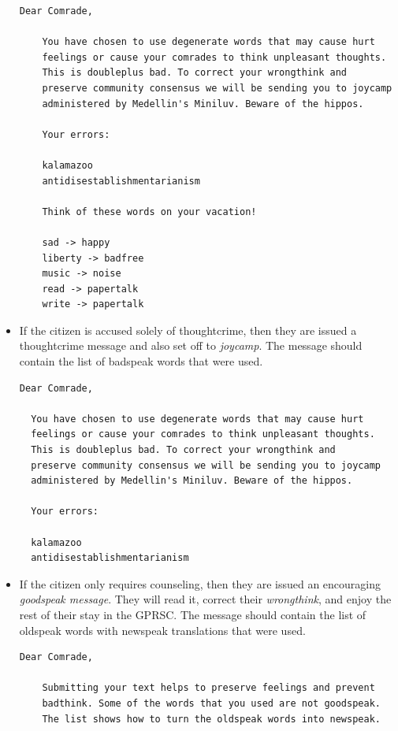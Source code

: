 \documentclass{article}
\begin{document}
\begin{itemize}
    \begin{lstlisting}[style=plainstyle]
    Dear Comrade,

    You have chosen to use degenerate words that may cause hurt
    feelings or cause your comrades to think unpleasant thoughts.
    This is doubleplus bad. To correct your wrongthink and
    preserve community consensus we will be sending you to joycamp
    administered by Medellin's Miniluv. Beware of the hippos.

    Your errors:

    kalamazoo
    antidisestablishmentarianism

    Think of these words on your vacation!

    sad -> happy
    liberty -> badfree
    music -> noise
    read -> papertalk
    write -> papertalk\end{lstlisting}

  \item If the citizen is accused solely of thoughtcrime, then they are
    issued a thoughtcrime message and also set off to \emph{joycamp}.
    The message should contain the list of badspeak words that were
    used.

  \begin{lstlisting}[style=plainstyle]
  Dear Comrade,

  You have chosen to use degenerate words that may cause hurt
  feelings or cause your comrades to think unpleasant thoughts.
  This is doubleplus bad. To correct your wrongthink and
  preserve community consensus we will be sending you to joycamp
  administered by Medellin's Miniluv. Beware of the hippos.

  Your errors:

  kalamazoo
  antidisestablishmentarianism\end{lstlisting}

  \item If the citizen only requires counseling, then they are issued an
    encouraging \emph{goodspeak message}. They will read it, correct
    their \emph{wrongthink}, and enjoy the rest of their stay in the
    GPRSC. The message should contain the list of oldspeak words with
    newspeak translations that were used.

    \begin{lstlisting}[style=plainstyle]
    Dear Comrade,

    Submitting your text helps to preserve feelings and prevent
    badthink. Some of the words that you used are not goodspeak.
    The list shows how to turn the oldspeak words into newspeak.


\end{lstlisting}
\end{itemize}
\end{document}
